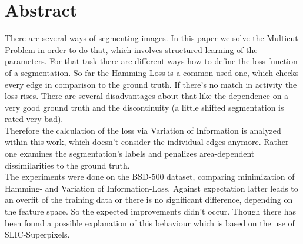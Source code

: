 \begingroup
\let\clearpage\relax
\let\cleardoublepage\relax
\let\cleardoublepage\relax

\chapter*{Abstract}
There are several ways of segmenting images. In this paper we solve the Multicut Problem in order to do that, which involves structured learning of the parameters. For that task there are different ways how to define the loss function of a segmentation. So far the Hamming Loss is a common used one, which checks every edge in comparison to the ground truth. If there's no match in activity the loss rises. There are several disadvantages about that like the dependence on a very good ground truth and the discontinuity (a little shifted segmentation is rated very bad). \\
Therefore the calculation of the loss via Variation of Information is analyzed within this work, which doesn't consider the individual edges anymore. Rather one examines the segmentation's labels and penalizes area-dependent dissimilarities to the ground truth. \\
The experiments were done on the BSD-500 dataset, comparing minimization of Hamming- and Variation of Information-Loss. Against expectation latter leads to an overfit of the training data or there is no significant difference, depending on the feature space. So the expected improvements didn't occur. Though there has been found a possible explanation of this behaviour which is based on the use of SLIC-Superpixels.

\newpage
\vfill

